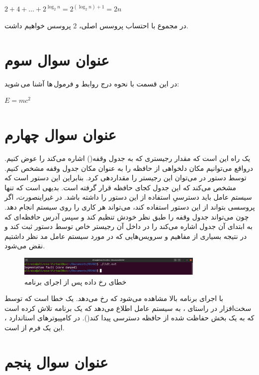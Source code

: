 \documentclass{article}
\begin{document}
\begin{center}
$
2+4+\ldots+2^{\log_2 n}=2^{(\log_2 n)+1}=2n
$
\end{center}
در مجموع با احتساب پروسس  اصلی، 2 پروسس خواهیم داشت.

\section{عنوان سوال سوم}
در این قسمت با نحوه درج روابط و فرمول\,ها آشنا می\,شوید:
\begin{center}
$E = m{c}^{2}$
\end{center}

\section{عنوان سوال چهارم}
یک راه این است که مقدار رجیستری که به جدول وقفه() اشاره می‌کند را عوض کنیم. درواقع می‌توانیم مکان دلخواهی از حافظه را به عنوان مکان جدول وقفه مشخص کنیم. توسط دستور  در  می‌توان این رجیستر را مقداردهی کرد. بنابراین این دستور است که مشخص می‌کند که این جدول کجای حافظه قرار گرفته است. بدیهی است که تنها سیستم عامل باید دسترسیِ استفاده از این دستور را داشته باشد. در غیراینصورت، اگر پروسسی بتواند از این دستور استفاده کند، می‌تواند هر کاری را روی سیستم انجام دهد. چون می‌تواند جدول وقفه را طبق نظر خودش تنظیم کند و سپس آدرس حافظه‌ای که به ابتدای آن جدول اشاره می‌کند را در داخل آن رجیستر خاص توسط دستور  ثبت کند و در نتیجه بسیاری از مفاهیم و سرویس‌هایی که در مورد سیستم عامل مد نظر داشتیم نقض می‌شود.
\lr{}
\begin{figure}[H]
    \centering
    \includegraphics[width=0.8\textwidth]{figures/4.png}
    \caption{خطای رخ داده پس از اجرای برنامه}
    \label{fig:fig1}
\end{figure}
با اجرای برنامه بالا مشاهده می‌شود که  رخ می‌دهد.  یک خطا است که توسط سخت‌افزار در راستای ، به سیستم عامل اطلاع می‌دهد که یک برنامه تلاش کرده است که به یک بخش حفاظت شده از حافظه دسترسی پیدا کند(). در کامپیوترهای استاندارد ، این یک فرم از  است.

\section{عنوان سوال پنجم}
\end{document}
